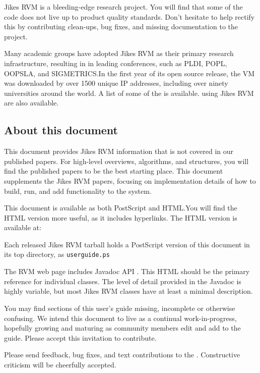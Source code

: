 Jikes RVM is a bleeding-edge research project.  You will find that
some of the code does not live up to product quality standards.  Don't
hesitate to help rectify this by contributing clean-ups, bug fixes,
and missing documentation to the project.

Many academic groups have adopted Jikes RVM as their primary research
infrastructure, resulting in
in leading
conferences, such as PLDI, POPL, OOPSLA, and SIGMETRICS.\@  In the first year
of its open source release, the VM was downloaded by over
1500 unique IP addresses, including over ninety
universities around the world. A list
of some of the  is available.
 using
Jikes RVM are also available.

\subsection{About this document}

This document provides Jikes\TMweb{} RVM information that is not
covered in our published papers.  For high-level overviews,
algorithms, and structures, you will find the published papers to be
the best starting place. This document supplements the Jikes RVM
papers, focusing on implementation details of how to build, run,
and add functionality to the system.

This document is available as both PostScript\Rboth{} and HTML.\@  You will find the
HTML version more useful, as it includes hyperlinks. The HTML version is
available at:
\begin{example}
\xlink{{\tt \RVMUserGuideURL}}{\RVMUserGuideURL}
\end{example}
Each released Jikes RVM tarball holds a PostScript version of this
document in its top directory, as {\tt userguide.ps}


The RVM web page includes Javadoc\TMboth{} API 
. 
This HTML should be the primary reference for individual classes. The
level of detail provided in the Javadoc is highly variable, but most
Jikes RVM classes have at least a minimal description.

You may find sections of this user's guide missing, incomplete or
otherwise confusing. We intend this document to live as a continual
work-in-progress, hopefully growing and maturing as community members
edit and add to the guide.  Please accept this invitation to
contribute.

Please send feedback, bug fixes, and text contributions to the 
.  
Constructive criticism will be cheerfully accepted. 

